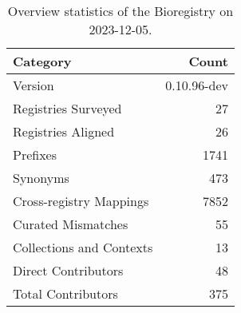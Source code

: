 \begin{table}
\caption{Overview statistics of the Bioregistry on 2023-12-05.}
\label{tab:bioregistry-summary}
\begin{tabular}{lr}
\toprule
Category & Count \\
\midrule
Version & 0.10.96-dev \\
Registries Surveyed & 27 \\
Registries Aligned & 26 \\
Prefixes & 1741 \\
Synonyms & 473 \\
Cross-registry Mappings & 7852 \\
Curated Mismatches & 55 \\
Collections and Contexts & 13 \\
Direct Contributors & 48 \\
Total Contributors & 375 \\
\bottomrule
\end{tabular}
\end{table}
